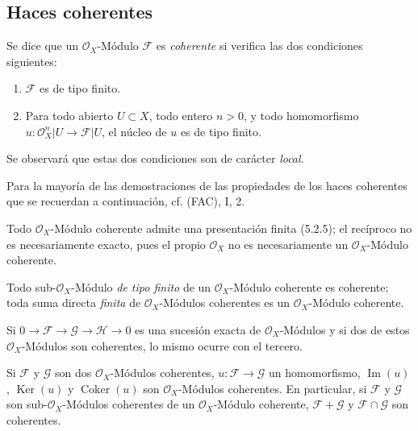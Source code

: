 \subsection{Haces coherentes}
\label{subsection:0.5.3-fr}

\begin{env}[5.3.1]
\label{0.5.3.1-fr}
Se dice que un $\mathcal{O}_X$-Módulo $\mathcal{F}$ es \emph{coherente} si
verifica las dos condiciones siguientes:
\begin{enumerate}
  \item[$a)$] $\mathcal{F}$ es de tipo finito.
  \item[$b)$] Para todo abierto $U\subset X$, todo entero $n>0$, y todo
    homomorfismo
    $u:\mathcal{O}_X^n|U\to\mathcal{F}|U$, el núcleo de $u$ es de tipo finito.
\end{enumerate}
Se observará que estas dos condiciones son de carácter \emph{local}.

Para la mayoría de las demostraciones de las propiedades de los haces coherentes
que se recuerdan a continuación, cf. (FAC), I, 2.
\end{env}

\begin{env}[5.3.2]
\label{0.5.3.2-fr}
Todo $\mathcal{O}_X$-Módulo coherente admite una presentación finita (5.2.5); el
recíproco no es necesariamente exacto, pues el propio $\mathcal{O}_X$ no es
necesariamente un $\mathcal{O}_X$-Módulo coherente.

Todo sub-$\mathcal{O}_X$-Módulo \emph{de tipo finito} de un
$\mathcal{O}_X$-Módulo coherente es coherente; toda suma directa \emph{finita}
de $\mathcal{O}_X$-Módulos coherentes es un $\mathcal{O}_X$-Módulo coherente.
\end{env}

\begin{env}[5.3.3]
\label{0.5.3.3-fr}
Si $0\to\mathcal{F}\to\mathcal{G}\to\mathcal{H}\to0$ es una sucesión exacta de
$\mathcal{O}_X$-Módulos y si dos de estos $\mathcal{O}_X$-Módulos son
coherentes, lo mismo ocurre con el tercero.
\end{env}

\begin{env}[5.3.4]
\label{0.5.3.4-fr}
Si $\mathcal{F}$ y $\mathcal{G}$ son dos $\mathcal{O}_X$-Módulos coherentes,
$u:\mathcal{F}\to\mathcal{G}$ un homomorfismo, $\operatorname{Im}(u)$,
$\operatorname{Ker}(u)$ y $\operatorname{Coker}(u)$ son
$\mathcal{O}_X$-Módulos coherentes. En particular, si $\mathcal{F}$ y
$\mathcal{G}$ son sub-$\mathcal{O}_X$-Módulos coherentes de un
$\mathcal{O}_X$-Módulo coherente, $\mathcal{F}+\mathcal{G}$ y
$\mathcal{F}\cap\mathcal{G}$ son coherentes.
\end{env}

